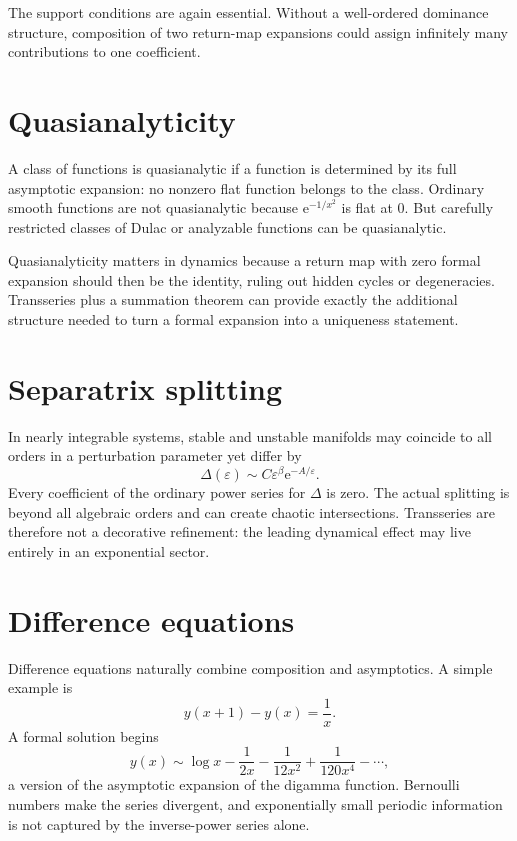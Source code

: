 \documentclass[11pt,oneside]{book}
\theoremstyle{definition}
\theoremstyle{remark}
\newcommand{\e}{\mathrm{e}}
\newcommand{\eps}{\varepsilon}
\begin{document}
The support conditions are again essential. Without a well-ordered dominance
structure, composition of two return-map expansions could assign infinitely many
contributions to one coefficient.

\section{Quasianalyticity}

A class of functions is quasianalytic if a function is determined by its full
asymptotic expansion: no nonzero flat function belongs to the class. Ordinary
smooth functions are not quasianalytic because $\e^{-1/x^2}$ is flat at $0$.
But carefully restricted classes of Dulac or analyzable functions can be
quasianalytic.

Quasianalyticity matters in dynamics because a return map with zero formal
expansion should then be the identity, ruling out hidden cycles or degeneracies.
Transseries plus a summation theorem can provide exactly the additional
structure needed to turn a formal expansion into a uniqueness statement.

\section{Separatrix splitting}

In nearly integrable systems, stable and unstable manifolds may coincide to all
orders in a perturbation parameter yet differ by
\[
  \Delta(\eps)\sim C\eps^\beta\e^{-A/\eps}.
\]
Every coefficient of the ordinary power series for $\Delta$ is zero. The actual
splitting is beyond all algebraic orders and can create chaotic intersections.
Transseries are therefore not a decorative refinement: the leading dynamical
effect may live entirely in an exponential sector.

\section{Difference equations}

Difference equations naturally combine composition and asymptotics. A simple
example is
\begin{equation}
  y(x+1)-y(x)=\frac1x.
  \label{eq:difference-harmonic}
\end{equation}
A formal solution begins
\[
  y(x)\sim\log x-\frac1{2x}-\frac1{12x^2}
       +\frac1{120x^4}-\cdots,
\]
a version of the asymptotic expansion of the digamma function. Bernoulli
numbers make the series divergent, and exponentially small periodic information
is not captured by the inverse-power series alone.
\end{document}
